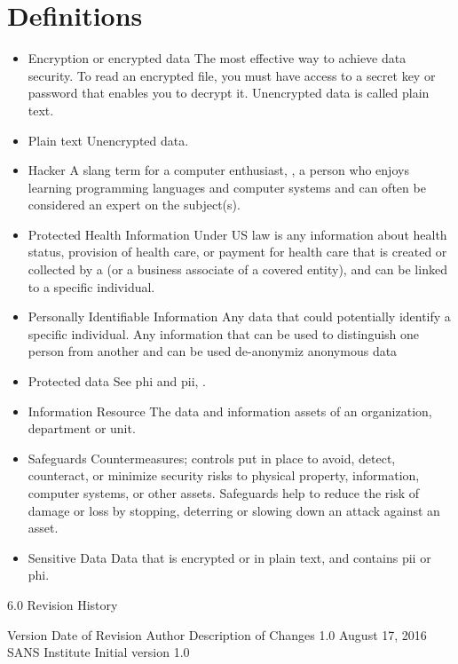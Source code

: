 \section{Definitions}\label{G:DBRP:D}
\begin{itemize}
\item{Encryption or encrypted data}
The most effective way to achieve data security.  
To read an encrypted file, you must have access to a secret key or password that enables you to decrypt it.  
Unencrypted data is called plain text.
\item{Plain text}
Unencrypted data.
\item{Hacker}
A slang term for a computer enthusiast, \ie{}, a person who enjoys learning programming languages and computer systems and can often be considered an expert on the subject(s).
\item{Protected Health Information}\label{G:DBRP:D:PHI}
Under US law is any information about health status, provision of health care, or payment for health care that is created or collected by a  (or a business associate of a covered entity), and can be linked to a specific individual.
\item{Personally Identifiable Information}\label{G:DBRP:D:PII}
Any data that could potentially identify a specific individual.  
Any information that can be used to distinguish one person from another and can be used  de-anonymiz anonymous data
\item{Protected data}
See \gls{phi} and \gls{pii}, .
\item{Information Resource}
The data and information assets of an organization, department\oxford{} or unit.
\item{Safeguards}
Countermeasures; controls put in place to avoid, detect, counteract, or minimize security risks to physical property, information, computer systems, or other assets.  
Safeguards help to reduce the risk of damage or loss by stopping, deterring\oxford{} or slowing down an attack against an asset.
\item{Sensitive Data}
Data that is encrypted or in plain text, and contains \gls{pii} or \gls{phi}.  
\end{itemize}

6.0 Revision History
                  
      
Version
Date of Revision
Author
Description of Changes
1.0
August 17, 2016
SANS Institute
Initial version
1.0




